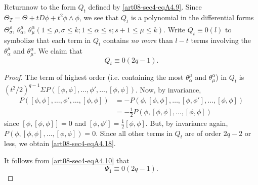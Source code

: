 Return\pageoriginale now to the form $Q_{t}$ defined by \eqref{art08-sec4-eqA4.9}. Since $\Theta_{T}=\Theta+tD\phi+t^{2}\phi\wedge \phi$, we see that $\underline{Q_{t}}$ is a polynomial in the differential forms $\Theta^{\rho}_{\sigma}$, $\theta^{\mu}_{\alpha}$, $\theta^{\alpha}_{\mu}(1\leq \rho, \sigma\leq k; 1\leq \alpha\leq s;s+1\leq \mu\leq k)$. Write $Q_{t}\equiv 0(l)$ to symbolize that each term in $Q_{t}$ contains {\em no more} than $l-t$ terms involving the $\theta^{\mu}_{\alpha}$ and $\theta^{\alpha}_{\mu}$. We claim that
\begin{equation*}
Q_{t}\equiv 0(2q-1).\tag{A4.18}\label{art08-sec4-A4.18}
\end{equation*}

\begin{proof}
The term of highest order (i.e. containing the most $\theta^{\mu}_{\alpha}$ and $\theta^{\alpha}_{\mu}$) in $Q_{t}$ is $(t^{2}/2)^{q-1}\Sigma P([\phi,\phi],\ldots,\phi',\ldots,[\phi,\phi])$. Now, by invariance,
\begin{align*}
P([\phi,\phi],\ldots,\phi',\ldots,[\phi,\phi]) &= -P(\phi,[\phi,\phi],\ldots,[\phi,\phi'],\ldots,[\phi,\phi])\\[3pt]
&= -\frac{1}{2}P(\phi,[\phi,\phi],\ldots,[\phi,\phi])
\end{align*}
since $[\phi,[\phi,\phi]]=0$ and $[\phi,\phi']=\frac{1}{2}[\phi,\phi]$. But, by invariance again, $P(\phi,[\phi,\phi],\ldots,[\phi,\phi])=0$. Since all other terms in $Q_{t}$ are of order $2q-2$ or less, we obtain \eqref{art08-sec4-eqA4.18}.

It follows from \eqref{art08-sec4-eqA4.10} that
\begin{equation*}
\Psi_{1}\equiv 0(2q-1).\tag{A4.19}\label{art08-sec4-eqA4.19}
\end{equation*}


\end{proof}
